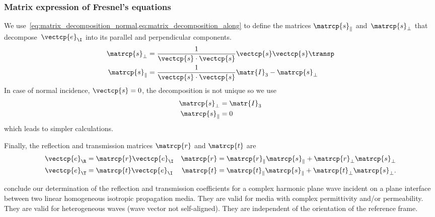 \subsubsection{Matrix expression of Fresnel's equations}
\label{sec:fresnel_matrix}
We use~\cref{eq:matrix_decomposition_normal,eq:matrix_decomposition_along} to define the matrices $\matrcp{s}_\parallel$ and~$\matrcp{s}_\perp$ that decompose~$\vectcp{e}_\I$ into its parallel and perpendicular components.
\begin{subequations}
    \begin{align}
        \matrcp{s}_\perp &= \frac{1}{\vectcp{s} \cdot \vectcp{s}} \vectcp{s} \vectcp{s}\transp
        \label{eq:s_perp}
        \\
        \matrcp{s}_\parallel &= \frac{1}{\vectcp{s} \cdot \vectcp{s}} \matr{I}_3 - \matrcp{s}_\perp
        \label{eq:s_para}
    \end{align}
\end{subequations}
In case of normal incidence, $\vectcp{s}=0$, the decomposition is not unique so we use
\begin{subequations}
    \begin{align}
        \matrcp{s}_\perp &= \matr{I}_3
        \label{eq:s_perp_normal}
        \\
        \matrcp{s}_\parallel &= 0
        \label{eq:s_para_normal}
    \end{align}
\end{subequations}
which leads to simpler calculations.

Finally, the reflection and transmission matrices $\matrcp{r}$ and $\matrcp{t}$ are
\begin{subequations}
    \begin{align}
        \vectcp{e}_\R &= \matrcp{r} \vectcp{e}_\I
        &
        \matrcp{r}
        &=
        \matrcp{r}_\parallel \matrcp{s}_\parallel +
        \matrcp{r}_\perp     \matrcp{s}_\perp
        \label{eq:fresnel_reflection_matrix}
        \\
        \vectcp{e}_\T &= \matrcp{t} \vectcp{e}_\I
        &
        \matrcp{t}
        &=
        \matrcp{t}_\parallel \matrcp{s}_\parallel +
        \matrcp{t}_\perp     \matrcp{s}_\perp
        \text{.}
        \label{eq:fresnel_transmission_matrix}
    \end{align}
\end{subequations}

 conclude our determination of the reflection and transmission coefficients for a complex harmonic plane wave incident on a plane interface between two linear homogeneous isotropic propagation media.
They are valid for media with complex permittivity and/or permeability.
They are valid for heterogeneous waves (wave vector not self-aligned).
They are independent of the orientation of the reference frame.

